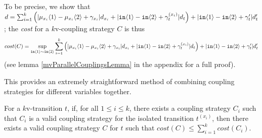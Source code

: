 To be precise, we show that $d = \sum_{i=1}^k\left(|\mu_{x_i}\langle1 \rangle-\mu_{x_i}\langle2 \rangle+\gamma_{x_i}|d_{x_i}+|\texttt{in}\langle1 \rangle-\texttt{in}\langle2 \rangle+\gamma_t^{(x_i)}|d_t\right)+|\texttt{in}\langle1 \rangle-\texttt{in}\langle2 \rangle+\gamma_t'|d_t'$;
the \textit{cost} for a $k$v-coupling strategy $C$ is thus \[cost(C) = \sup_{\texttt{in}\langle1 \rangle\sim\texttt{in}\langle2 \rangle}\sum_{i=1}^k\left(|\mu_{x_i}\langle1 \rangle-\mu_{x_i}\langle2 \rangle+\gamma_{x_i}|d_{x_i}+|\texttt{in}\langle1 \rangle-\texttt{in}\langle2 \rangle+\gamma_t^{(x_i)}|d_t\right)+|\texttt{in}\langle1 \rangle-\texttt{in}\langle2 \rangle+\gamma_t'|d_t'\] (see lemma \ref{mvParallelCouplingsLemma} in the appendix for a full proof).

This provides an extremely straightforward method of combining coupling strategies for different variables together.

\begin{cor}
    For a $k$v-transition $t$, if, for all $1\leq i\leq k$, there exists a coupling strategy $C_i$ such that $C_i$ is a valid coupling strategy for the isolated transition $t^{(x_i)}$, then there exists a valid coupling strategy $C$ for $t$ such that $cost(C)\leq \sum_{i=1}^k cost(C_i)$.
\end{cor}


